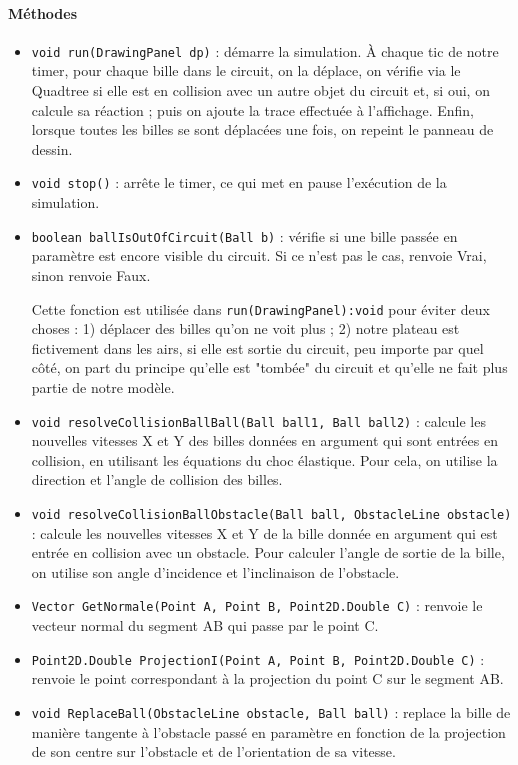 \documentclass{report}
\begin{document}
\paragraph*{Méthodes}
\begin{itemize}
\item \texttt{void run(DrawingPanel dp)} : démarre la simulation. À chaque tic de notre timer, pour chaque bille dans le circuit, on la déplace, on vérifie via le Quadtree si elle est en collision avec un autre objet du circuit et, si oui, on calcule sa réaction ; puis on ajoute la trace effectuée à l'affichage. Enfin, lorsque toutes les billes se sont déplacées une fois, on repeint le panneau de dessin.
\item \texttt{void stop()} : arrête le timer, ce qui met en pause l'exécution de la simulation. 
\item \texttt{boolean ballIsOutOfCircuit(Ball b)} : vérifie si une bille passée en paramètre est encore visible du circuit. Si ce n'est pas le cas, renvoie Vrai, sinon renvoie Faux. 

Cette fonction est utilisée dans \texttt{run(DrawingPanel):void} pour éviter deux choses : 1) déplacer des billes qu'on ne voit plus ; 2) notre plateau est fictivement dans les airs, si elle est sortie du circuit, peu importe par quel côté, on part du principe qu'elle est "tombée" du circuit et qu'elle ne fait plus partie de notre modèle.
\item \texttt{void resolveCollisionBallBall(Ball ball1, Ball ball2)} : calcule les nouvelles vitesses X et Y des billes données en argument qui sont entrées en collision, en utilisant les équations du choc élastique. Pour cela, on utilise la direction et l'angle de collision des billes.
\item \texttt{void resolveCollisionBallObstacle(Ball ball, ObstacleLine obstacle)} : calcule les nouvelles vitesses X et Y de la bille donnée en argument qui est entrée en collision avec un obstacle. Pour calculer l'angle de sortie de la bille, on utilise son angle d'incidence et l'inclinaison de l'obstacle.
\item \texttt{Vector GetNormale(Point A, Point B, Point2D.Double C)} : renvoie le vecteur normal du segment AB qui passe par le point C.
\item \texttt{Point2D.Double ProjectionI(Point A, Point B, Point2D.Double C)} : renvoie le point correspondant à la projection du point C sur le segment AB.
\item \texttt{void ReplaceBall(ObstacleLine obstacle, Ball ball)} : replace la bille de manière tangente à l'obstacle passé en paramètre en fonction de la projection de son centre sur l'obstacle et de l'orientation de sa vitesse.
\end{itemize}
\end{document}

